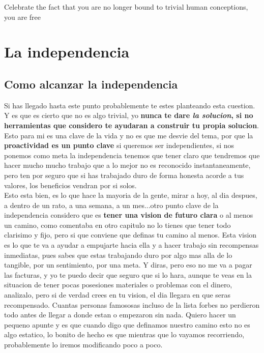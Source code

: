 \begin{savequote}
	Celebrate the fact that you are no longer bound to trivial human conceptions, you are free
\end{savequote}

\chapter{La independencia}
\section{Como alcanzar la independencia}
Si has llegado hasta este punto probablemente te estes planteando esta cuestion. Y es que es cierto que no es algo trivial, yo \textbf{nunca te dare \textit{la solucion}, si no herramientas que considero te ayudaran a construir tu propia solucion}.\\

Esto para mi es una clave de la vida y no es que me desvie del tema, por que la \textbf{proactividad es un punto clave} si queremos ser independientes, si nos ponemos como meta la independencia tenemos que tener claro que tendremos que hacer mucho mucho trabajo que a lo mejor no es reconocido instantaneamente, pero ten por seguro que si has trabajado duro de forma honesta acorde a tus valores, los beneficios vendran por si solos.\\

Esto esta bien, es lo que hace la mayoria de la gente, mirar a hoy, al dia despues, a dentro de un rato, a una semana, a un mes...otro punto clave de la independencia considero que es \textbf{tener una vision de futuro clara} o al menos un camino, como comentaba en otro capitulo no lo tienes que tener todo clarisimo y fijo, pero si que conviene que definas tu camino al menos. Esta vision es lo que te va a ayudar a empujarte hacia ella y a hacer trabajo sin recompensas inmediatas, pues sabes que estas trabajando duro por algo mas alla de lo tangible, por un sentimiento, por una meta. Y diras, pero eso no me va a pagar las facturas, y yo te puedo decir que seguro que si lo hara, aunque te veas en la situacion de tener pocas posesiones materiales o problemas con el dinero, analizalo, pero si de verdad crees en tu vision, el dia llegara en que seras recompensado. Cuantas personas famososas incluso de la lista forbes no perdieron todo antes de llegar a donde estan o empezaron sin nada. Quiero hacer un pequeno apunte y es que cuando digo que definamos nuestro camino esto no es algo estatico, lo bonito de hecho es que mientras que lo vayamos recorriendo, probablemente lo iremos modificando poco a poco.\\

